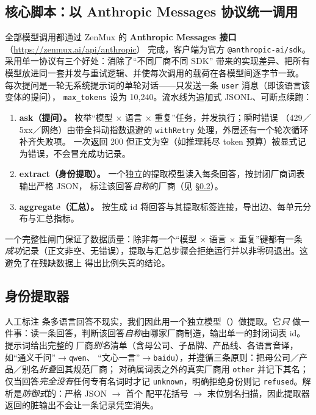 \documentclass[11pt,fontset=fandol]{ctexart}
\begin{document}
\subsection{核心脚本：以 Anthropic Messages 协议统一调用}\label{sec:protocol}
全部模型调用都通过 ZenMux 的 \textbf{Anthropic Messages 接口}（\url{https://zenmux.ai/api/anthropic}）
完成，客户端为官方 \texttt{@anthropic-ai/sdk}。采用单一协议有三个好处：消除了``不同厂商不同 SDK''
带来的实现差异、把所有模型放进同一套并发与重试逻辑、并使每次调用的载荷在各模型间逐字节一致。
每次提问是一轮无系统提示词的单轮对话——只发送一条 \texttt{user} 消息（即该语言该变体的提问），
\texttt{max\_tokens} 设为 10{,}240。流水线为追加式 JSONL、可断点续跑：

\begin{enumerate}
  \item \textbf{ask（提问）。} 枚举``模型 $\times$ 语言 $\times$ 重复''任务，并发执行；瞬时错误
  （429／5xx／网络）由带全抖动指数退避的 \texttt{withRetry} 处理，外层还有一个轮次循环补齐失败项。
  一次返回 200 但正文为空（如推理耗尽 token 预算）被显式记为错误，不会冒充成功记录。
  \item \textbf{extract（身份提取）。} 一个独立的提取模型读入每条回答，按封闭厂商词表输出严格 JSON，
  标注该回答\emph{自称}的厂商（见 \S\ref{sec:extractor}）。
  \item \textbf{aggregate（汇总）。} 按生成 id 将回答与其提取标签连接，导出边、每单元分布与汇总指标。
\end{enumerate}

\noindent 一个完整性闸门保证了数据质量：除非每一个``模型 $\times$ 语言 $\times$ 重复''键都有一条
\emph{成功}记录（正文非空、无错误），提取与汇总步骤会拒绝运行并以非零码退出。这避免了在残缺数据上
得出比例失真的结论。

\subsection{身份提取器}\label{sec:extractor}
人工标注 \statTotal{} 条多语言回答不现实，我们因此用一个独立模型（）做提取。它\emph{只}
做一件事：读一条回答，判断该回答\emph{自称}由哪家厂商制造，输出单一的封闭词表 id。提示词给出完整的
厂商\emph{别名}清单（含母公司、子品牌、产品线、各语言音译，如``通义千问''$\to$\texttt{qwen}、
``文心一言''$\to$\texttt{baidu}），并遵循三条原则：把母公司／产品／别名\emph{折叠}回其规范厂商；
对确属词表之外的真实厂商用 \texttt{other} 并记下其名；仅当回答\emph{完全没有}任何专有名词时才记
\texttt{unknown}，明确拒绝身份则记 \texttt{refused}。解析是\emph{防御式}的：严格 JSON $\to$ 首个
配平花括号 $\to$ 末位别名扫描，因此提取器返回的脏输出不会让一条记录凭空消失。
\end{document}

